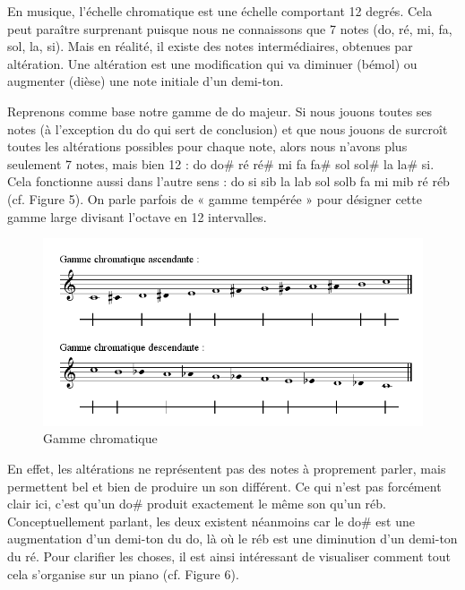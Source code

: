 \documentclass[a4paper,12pt]{article}
\begin{document}
En musique, l'échelle chromatique est une échelle comportant 12 degrés. Cela peut paraître surprenant puisque nous ne connaissons que 7 notes (do, ré, mi, fa, sol, la, si). Mais en réalité, il existe des notes intermédiaires, obtenues par altération. Une altération est une modification qui va diminuer (bémol) ou augmenter (dièse) une note initiale d'un demi-ton.

Reprenons comme base notre gamme de do majeur. Si nous jouons toutes ses notes (à l'exception du do qui sert de conclusion) et que nous jouons de surcroît toutes les altérations possibles pour chaque note, alors nous n'avons plus seulement 7 notes, mais bien 12 : do do\# ré ré\# mi fa fa\# sol sol\# la la\# si. Cela fonctionne aussi dans l'autre sens : do si sib la lab sol solb fa mi mib ré réb (cf. Figure 5). On parle parfois de « gamme tempérée » pour désigner cette gamme large divisant l'octave en 12 intervalles.

\begin{figure}[h]
  \begin{center}
    \includegraphics[scale=0.5]{gamme-chromatique.png}
    \caption{Gamme chromatique}
  \end{center}
\end{figure}

En effet, les altérations ne représentent pas des notes à proprement parler, mais permettent bel et bien de produire un son différent. Ce qui n'est pas forcément clair ici, c'est qu'un do\# produit exactement le même son qu'un réb. Conceptuellement parlant, les deux existent néanmoins car le do\# est une augmentation d'un demi-ton du do, là où le réb est une diminution d'un demi-ton du ré. Pour clarifier les choses, il est ainsi intéressant de visualiser comment tout cela s'organise sur un piano (cf. Figure 6).
\end{document}
